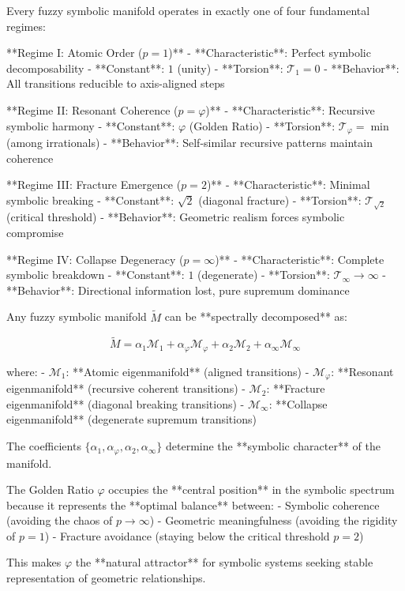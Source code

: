 \begin{proposition}
\label{prop:bk5_complete_symbolic_regime_classification}
Every fuzzy symbolic manifold operates in exactly one of four fundamental regimes:

**Regime I: Atomic Order ($p = 1$)**
- **Characteristic**: Perfect symbolic decomposability
- **Constant**: $1$ (unity)
- **Torsion**: $\mathcal{T}_1 = 0$
- **Behavior**: All transitions reducible to axis-aligned steps

**Regime II: Resonant Coherence ($p = \varphi$)**
- **Characteristic**: Recursive symbolic harmony
- **Constant**: $\varphi$ (Golden Ratio)
- **Torsion**: $\mathcal{T}_\varphi = \min$ (among irrationals)
- **Behavior**: Self-similar recursive patterns maintain coherence

**Regime III: Fracture Emergence ($p = 2$)**
- **Characteristic**: Minimal symbolic breaking
- **Constant**: $\sqrt{2}$ (diagonal fracture)
- **Torsion**: $\mathcal{T}_{\sqrt{2}}$ (critical threshold)
- **Behavior**: Geometric realism forces symbolic compromise

**Regime IV: Collapse Degeneracy ($p = \infty$)**
- **Characteristic**: Complete symbolic breakdown  
- **Constant**: $1$ (degenerate)
- **Torsion**: $\mathcal{T}_\infty \to \infty$
- **Behavior**: Directional information lost, pure supremum dominance
\end{proposition}

\begin{theorem}
\label{thm:bk5_symbolic_manifold_spectral_decomposition}
Any fuzzy symbolic manifold $\tilde{M}$ can be **spectrally decomposed** as:

$$\tilde{M} = \alpha_1 \mathcal{M}_1 + \alpha_\varphi \mathcal{M}_\varphi + \alpha_2 \mathcal{M}_2 + \alpha_\infty \mathcal{M}_\infty$$

where:
- $\mathcal{M}_1$: **Atomic eigenmanifold** (aligned transitions)
- $\mathcal{M}_\varphi$: **Resonant eigenmanifold** (recursive coherent transitions)  
- $\mathcal{M}_2$: **Fracture eigenmanifold** (diagonal breaking transitions)
- $\mathcal{M}_\infty$: **Collapse eigenmanifold** (degenerate supremum transitions)

The coefficients $\{\alpha_1, \alpha_\varphi, \alpha_2, \alpha_\infty\}$ determine the **symbolic character** of the manifold.
\end{theorem}

\begin{corollary}
\label{corollary:bk5_phi_centrality_principle}
The Golden Ratio $\varphi$ occupies the **central position** in the symbolic spectrum because it represents the **optimal balance** between:
- Symbolic coherence (avoiding the chaos of $p \to \infty$)
- Geometric meaningfulness (avoiding the rigidity of $p = 1$)
- Fracture avoidance (staying below the critical threshold $p = 2$)

This makes $\varphi$ the **natural attractor** for symbolic systems seeking stable representation of geometric relationships.
\end{corollary}

